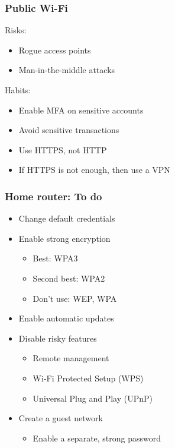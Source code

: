 \documentclass[blue]{beamer}
\begin{document}
\begin{frame}
\frametitle{Public Wi-Fi}

\begin{block}{Risks:}
\begin{itemize}
  \item Rogue access points
  \item Man-in-the-middle attacks
\end{itemize}
\end{block}

\begin{block}{Habits:}
\begin{itemize}
  \item Enable MFA on sensitive accounts
  \item Avoid sensitive transactions
  \item Use HTTPS, not HTTP
  \item If HTTPS is not enough, then use a VPN
\end{itemize}
\end{block}

\end{frame}



\begin{frame}
\frametitle{Home router: To do}

\begin{itemize}
  \item Change default credentials
  \item Enable strong encryption
  \begin{itemize}
    \item Best: WPA3
    \item Second best: WPA2
    \item Don't use: WEP, WPA
  \end{itemize}
  \item Enable automatic updates
  \item Disable risky features
  \begin{itemize}
    \item Remote management
    \item Wi-Fi Protected Setup (WPS)
    \item Universal Plug and Play (UPnP)
  \end{itemize}
  \item Create a guest network
  \begin{itemize}
    \item Enable a separate, strong password
  \end{itemize}
\end{itemize}

\end{frame}
\end{document}
